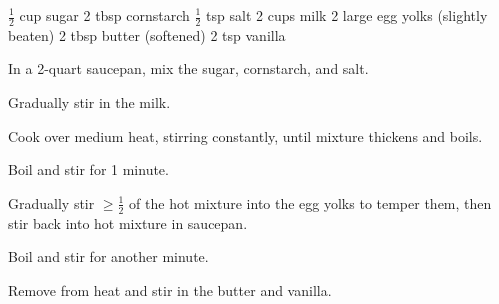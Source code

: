 \dishtype{}
\begin{ingreds}
    $\frac{1}{2}$ cup sugar
    2 tbsp cornstarch
    $\frac{1}{2}$ tsp salt
    2 cups milk
    2 large egg yolks (slightly beaten)
    2 tbsp butter (softened)
    2 tsp vanilla
\end{ingreds}
\begin{method}
    In a 2-quart saucepan, mix the sugar, cornstarch, and salt.\par
    Gradually stir in the milk.\par
    Cook over medium heat, stirring constantly, until mixture thickens and boils.\par
    Boil and stir for 1 minute.\par
    Gradually stir $\geq\frac{1}{2}$ of the hot mixture into the egg yolks to temper them, then stir back into hot mixture in saucepan.\par
    Boil and stir for another minute.\par
    Remove from heat and stir in the butter and vanilla.       
\end{method}